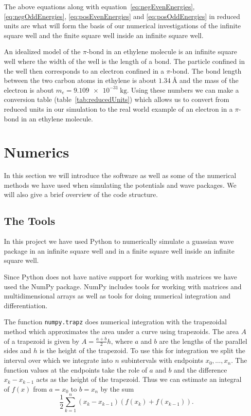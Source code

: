 \documentclass[12pt,a4paper]{article}
\begin{document}
The above equations along with equation~\eqref{eq:negEvenEnergies}, \eqref{eq:negOddEnergies}, \eqref{eq:posEvenEnergies} and \eqref{eq:posOddEnergies} in reduced units are what will form the basis of our numerical investigations of the infinite square well and the finite square well inside an infinite square well.

An idealized model of the $\pi$-bond in an ethylene molecule is an infinite square well where the width of the well is the length of a bond. The particle confined in the well then corresponds to an electron confined in a $\pi$-bond. The bond length between the two carbon atoms in ethylene is about $\SI{1.34}{\angstrom}$ and the mass of the electron is about $m_e = \SI{9.109e-31}{\kilo\gram}$. Using these numbers we can make a conversion table (table~\ref{tab:reducedUnits}) which allows us to convert from reduced units in our simulation to the real world example of an electron in a $\pi$-bond in an ethylene molecule.

\section{Numerics}
In this section we will introduce the software as well as some of the numerical methods we have used when simulating the potentials and wave packages. We will also give a brief overview of the code structure.

\subsection{The Tools}
In this project we have used Python to numerically simulate a guassian wave package in an infinite square well and in a finite square well inside an infinite square well.

Since Python does not have native support for working with matrices we have used the NumPy package. NumPy includes tools for working with matrices and multidimensional arrays as well as tools for doing numerical integration and differentiation.

The function \lstinline{numpy.trapz} does numerical integration with the trapezoidal method which approximates the area under a curve using trapezoids.
The area $A$ of a trapezoid is given by $A = \frac{a + b}{2} h$, where $a$ and $b$ are the lengths of the parallel sides and $h$ is the height of the trapezoid. To use this for integration we split the interval over which we integrate into $n$ subintervals with endpoints $x_0, \ldots, x_n$. The function values at the endpoints take the role of $a$ and $b$ and the difference $x_{k} - x_{k - 1}$ acts as the height of the trapezoid. Thus we can estimate an integral of $f(x)$ from $a = x_0$ to $b = x_n$ by the sum
\begin{equation}
\frac{1}{2} \sum_{k = 1}^n \left(x_{k} - x_{k - 1}\right) \left(f(x_k) + f(x_{k - 1}) \right).
\end{equation}
\end{document}
